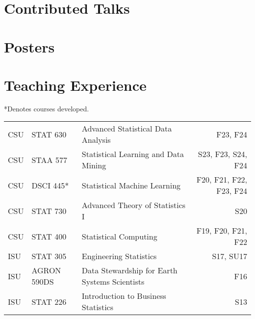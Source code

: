 \documentclass[margin,line]{res}
\begin{document}
\begin{resume}


\section{\sc Contributed Talks}
\printbibliography[keyword=talk-contributed, heading=none, resetnumbers=true]

\section{\sc Posters}
\printbibliography[keyword=poster, heading=none, resetnumbers=true]

\section{\sc Teaching Experience}
*Denotes courses developed.\\

\vspace{-.4cm}

\begin{table}[H]
\begin{tabular}{l l l r}
CSU & STAT 630 & Advanced Statistical Data Analysis & F23, F24 \\
CSU & STAA 577 & Statistical Learning and Data Mining  & S23, F23, S24, F24 \\
CSU & DSCI 445* & Statistical Machine Learning & F20, F21, F22, F23, F24 \\
CSU & STAT 730 & Advanced Theory of Statistics I & S20 \\
CSU & STAT 400 & Statistical Computing & F19, F20, F21, F22 \\
ISU & STAT 305 & Engineering Statistics & S17, SU17 \\
ISU & AGRON 590DS & Data Stewardship for Earth Systems Scientists & F16 \\
ISU & STAT 226 & Introduction to Business Statistics & S13 \\
\end{tabular}
\end{table}


\end{resume}
\end{document}
